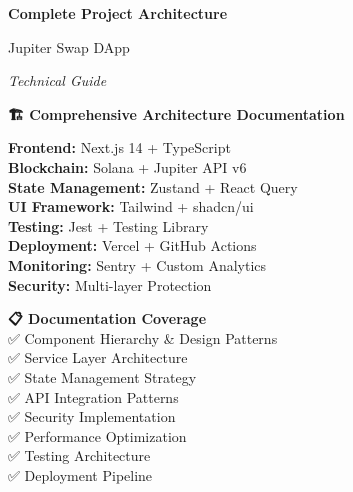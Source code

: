 \documentclass[11pt,a4paper]{article}
\begin{document}
\begin{titlepage}
    \centering
    \vspace*{1cm}
    
    {\Huge\textbf{\textcolor{jupiterBlue}{Complete Project Architecture}}\par}
    \vspace{0.5cm}
    {\LARGE\textcolor{deauraPurple}{Jupiter Swap DApp}\par}
    \vspace{0.3cm}
    {\Large\textit{Technical Guide}\par}
    
    \vspace{1.5cm}
    
    \begin{tcolorbox}[colback=jupiterBlue!10,colframe=jupiterBlue,width=0.9\textwidth]
        \centering
        \textbf{🏗️ Comprehensive Architecture Documentation}\\
        \vspace{0.5cm}
        \begin{multicols}{2}
        \textbf{Frontend:} Next.js 14 + TypeScript\\
        \textbf{Blockchain:} Solana + Jupiter API v6\\
        \textbf{State Management:} Zustand + React Query\\
        \textbf{UI Framework:} Tailwind + shadcn/ui\\
        \textbf{Testing:} Jest + Testing Library\\
        \textbf{Deployment:} Vercel + GitHub Actions\\
        \textbf{Monitoring:} Sentry + Custom Analytics\\
        \textbf{Security:} Multi-layer Protection
        \end{multicols}
    \end{tcolorbox}
    
    \vspace{1.5cm}
    
    \begin{tcolorbox}[colback=solanaGreen!10,colframe=solanaGreen,width=0.8\textwidth]
        \centering
        \textbf{📋 Documentation Coverage}\\
        \vspace{0.3cm}
        ✅ Component Hierarchy \& Design Patterns\\
        ✅ Service Layer Architecture\\
        ✅ State Management Strategy\\
        ✅ API Integration Patterns\\
        ✅ Security Implementation\\
        ✅ Performance Optimization\\
        ✅ Testing Architecture\\
        ✅ Deployment Pipeline
    \end{tcolorbox}
    

\end{titlepage}
\end{document}
